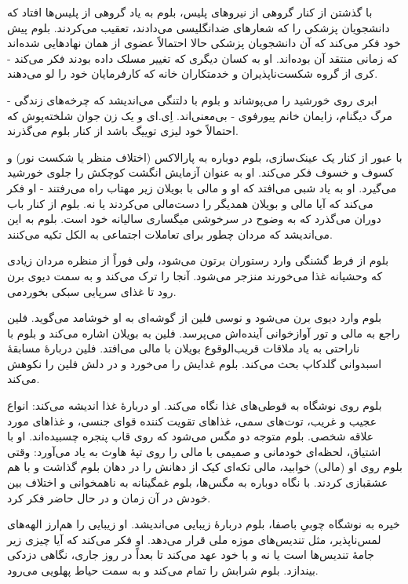 \documentclass[12pt]{book}
\begin{document}
    با گذشتن از کنار گروهی از نیروهای پلیس، بلوم به یاد گروهی از پلیس‌ها افتاد که دانشجویان پزشکی را که شعارهای ضدانگلیسی می‌دادند، تعقیب می‌کردند. بلوم پیش خود فکر می‌کند که آن دانشجویان پزشکی حالا احتمالاً عضوی از همان نهادهایی شده‌اند که زمانی منتقد آن بوده‌اند. او به کسان دیگری که تغییر مسلک داده بودند فکر می‌کند - کری از گروه شکست‌ناپذیران و خدمتکاران خانه که کارفرمایان خود را لو می‌دهند.

    ابری روی خورشید را می‌پوشاند و بلوم با دلتنگی می‌اندیشد که چرخه‌های زندگی - مرگ دیگنام، زایمان خانم پیورفوی -  بی‌معنی‌اند. اِی.ای و یک زن جوان شلخته‌پوش که احتمالاً خود لیزی توییگ باشد از کنار بلوم می‌گذرند.

    با عبور از کنار یک عینک‌سازی، بلوم دوباره به پارالاکس (اختلاف منظر یا شکست نور) و کسوف و خسوف فکر می‌کند. او به عنوان آزمایش انگشت کوچکش را جلوی خورشید می‌گیرد. او به یاد شبی می‌افتد که او و مالی با بویلان زیر مهتاب راه می‌رفتند - او فکر می‌کند که آیا مالی و بویلان همدیگر را دست‌مالی می‌کردند یا نه. بلوم از کنار باب دوران می‌گذرد که به وضوح در سرخوشی میگساری سالیانه خود است. بلوم به این می‌اندیشد که مردان چطور برای تعاملات اجتماعی به الکل تکیه می‌کنند.

    بلوم از فرط گشنگی وارد رستوران برتون می‌شود، ولی فوراً از منظره مردان زیادی که وحشیانه غذا می‌خورند منزجر می‌شود. آنجا را ترک می‌کند و به سمت دیوی برن می‎‌رود تا غذای سرپایی سبکی بخورد.

    بلوم وارد دیوی برن می‌شود و نوسی فلین از گوشه‌ای به او خوشامد می‌گوید. فلین راجع به مالی و تور آوازخوانی آینده‌اش می‌پرسد. فلین به بویلان اشاره می‌کند و بلوم با ناراحتی به یاد ملاقات قریب‌الوقوع بویلان با مالی می‌افتد. فلین دربارۀ مسابقۀ اسبدوانی گلدکاپ بحث می‌کند. بلوم غدایش را می‌خورد و در دلش فلین را نکوهش می‌کند.

    بلوم روی نوشگاه به قوطی‌های غذا نگاه می‌کند. او دربارۀ غذا اندیشه می‌کند: انواع عجیب و غریب، توت‌های سمی، غذاهای تقویت کننده قوای جنسی، و غذاهای مورد علاقه شخصی. بلوم متوجه دو مگس می‌شود که روی قاب پنجره چسبیده‌اند. او با اشتیاق، لحظه‌ای خودمانی و صمیمی با مالی را روی تپۀ هاوث به یاد می‌آورد: وقتی بلوم روی او (مالی) خوابید، مالی تکه‌ای کیک از دهانش را در دهان بلوم گذاشت و با هم عشقبازی کردند. با نگاه دوباره به مگس‌ها، بلوم غمگینانه به ناهمخوانی و اختلاف بین خودش در آن زمان و در حال حاضر فکر کرد.

    خیره به نوشگاه چوبیِ باصفا، بلوم دربارۀ زیبایی می‌اندیشد. او زیبایی را هم‌ارز الهه‌های لمس‌ناپذیر، مثل تندیس‌های موزه ملی قرار می‌دهد. او فکر می‌کند که آیا چیزی زیر جامۀ تندیس‌ها است یا نه و با خود عهد می‌کند تا بعداً در روز جاری، نگاهی دزدکی بیندازد. بلوم شرابش را تمام می‌کند و به سمت حیاط پهلویی می‌رود.
\end{document}
